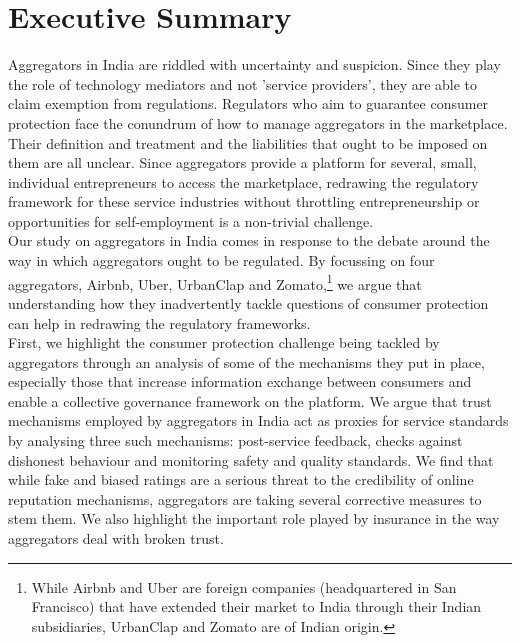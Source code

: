 \documentclass[a4paper, 12pt]{article}
\begin{document}
                    \section*{Executive Summary}
                   Aggregators in India are riddled with uncertainty and suspicion. Since they play the role of technology mediators and not 'service providers', they are able to claim exemption from regulations. Regulators who aim to guarantee consumer protection face the conundrum of how to manage aggregators in the marketplace. Their definition and treatment and the liabilities that ought to be imposed on them are all unclear. Since aggregators provide a platform for several, small, individual entrepreneurs to access the marketplace, redrawing the regulatory framework for these service industries without throttling entrepreneurship or opportunities for self-employment is a non-trivial challenge. \\
                    
                    Our study on aggregators in India comes in response to the debate around the way in which aggregators ought to be regulated. By focussing on four aggregators, Airbnb, Uber, UrbanClap and Zomato,\footnote{While Airbnb and Uber are foreign companies (headquartered in San Francisco) that have extended their market to India through their Indian subsidiaries, UrbanClap and Zomato are of Indian origin.} we argue that understanding how they inadvertently tackle questions of consumer protection can help in redrawing the regulatory frameworks. \\
                    
                   First, we highlight the consumer protection challenge being tackled by aggregators through an analysis of some of the mechanisms they put in place, especially those that increase information exchange between consumers and enable a collective governance framework on the platform. We argue that trust mechanisms employed by aggregators in India act as proxies for service standards by analysing three such mechanisms: post-service feedback, checks against dishonest behaviour and monitoring safety and quality standards. We find that while fake and biased ratings are a serious threat to the credibility of online reputation mechanisms, aggregators are taking several corrective measures to stem them. We also highlight the important role played by insurance in the way aggregators deal with broken trust.\\
                    
\end{document}
